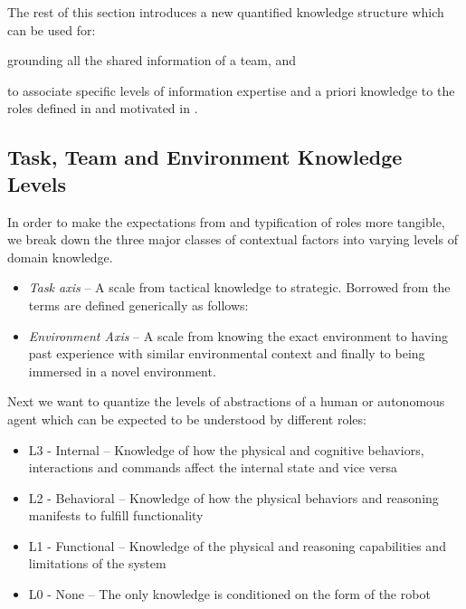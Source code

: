 \documentclass[letterpaper, 10 pt, conference]{ieeeconf}  %
\theoremstyle{definition}
\begin{document}
{
\color{blue}
The rest of this section introduces a new quantified knowledge structure which can be used for:
\begin{enumerate*}
    \item grounding all the shared information of a team, and
    \item to associate specific levels of information expertise and a priori knowledge to the roles defined in \cite{Scholtz2003, Goodrich2007} and motivated in \cite{Fong2003, Dautenhahn2007, Feil-Seifer}.
\end{enumerate*}

\subsection{Task, Team and Environment Knowledge Levels}

In order to make the expectations from and typification of roles more tangible, we break down the three major classes of contextual factors into varying levels of domain knowledge.
\begin{itemize}
    \item \textit{Task axis} -- A scale from tactical knowledge to strategic. Borrowed from 
    \cite{sheehan2004military} the terms are defined generically as follows: 
    \item \textit{Environment Axis} -- A scale from knowing the exact environment to having past experience with similar environmental context and finally to being immersed in a novel environment.
\end{itemize}

Next we want to quantize the levels of abstractions of a human or autonomous agent which can be expected to be understood by different roles:
\begin{itemize}
    \item L3 - Internal -- Knowledge of how the physical and cognitive behaviors, interactions and commands affect the internal state and vice versa
    \item L2 - Behavioral -- Knowledge of how the physical behaviors and reasoning manifests to fulfill functionality
    \item L1 - Functional -- Knowledge of the physical and reasoning capabilities and limitations of the system
    \item L0 - None -- The only knowledge is conditioned on the form of the robot
\end{itemize}

}
\end{document}
